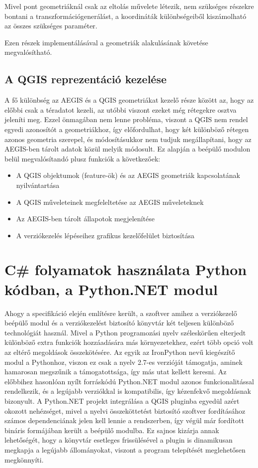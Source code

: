 Mivel pont geometriáknál csak az eltolás művelete létezik, nem szükséges részekre bontani a transzformációgenerálást, a koordináták különbségeiből kiszámolható az összes szükséges paraméter.

Ezen részek implementálásával a geometriák alakulásának követése megvalósítható.

\subsection{A QGIS reprezentáció kezelése}
A fő különbség az AEGIS és a QGIS geometriákat kezelő része között az, hogy az előbbi csak a téradatot kezeli, az utóbbi viszont ezeket még rétegekre osztva jeleníti meg. Ezzel önmagában nem lenne probléma, viszont a QGIS nem rendel egyedi azonosítót a geometriákhoz, így előfordulhat, hogy két különböző rétegen azonos geometria szerepel, és módosításukkor nem tudjuk megállapítani, hogy az AEGIS-ben tárolt adatok közül melyik módosult. Ez alapján  a beépülő modulon belül megvalósítandó plusz funkciók a következőek:
\begin{itemize}
	\item A QGIS objektumok (feature-ök) és az AEGIS geometriák kapcsolatának nyilvántartása
	\item A QGIS műveleteinek megfeleltetése az AEGIS műveleteknek
	\item Az AEGIS-ben tárolt állapotok megjelenítése 
	\item A verziókezelés lépéseihez grafikus kezelőfelület biztosítása
\end{itemize}


\section{C\# folyamatok használata Python kódban, a Python.NET modul }
Ahogy a specifikáció elején említésre került, a szoftver amihez a verziókezelő beépülő modul és a verziókezelést biztosító könyvtár két teljesen különböző technológiát használ. Mivel a Python programozási nyelv széleskörűen elterjedt különböző extra funkciók hozzáadására más környezetekhez, ezért több opció volt az eltérő megoldások összekötésére. Az egyik az IronPython nevű kiegészítő modul a Pythonhoz, viszon ez csak a nyelv 2.7-es verzióját támogatja, aminek hamarosan megszűnik a támogatottsága, így más utat kellett keresni. Az előbbihez hasonlóan nyílt forráskódú Python.NET modul azonos funkcionalitással rendelkezik, és a legújabb verziókkal is kompatibilis, így kézenfekvő megoldásnak bizonyult. A Python.NET projekt integrálása a QGIS pluginba egyedül azért okozott nehézséget, mivel a nyelvi összeköttetést biztosító szoftver fordításához számos dependenciának jelen kell lennie a rendszerben, így végül már fordított bináris formájában került a beépülő modulba. Ez sajnos kizárja annak lehetőségét, hogy a könyvtár esetleges frissülésével a plugin is dinamikusan megkapja a legújabb állományokat, viszont a program telepítését meglehetősen megkönnyíti.
